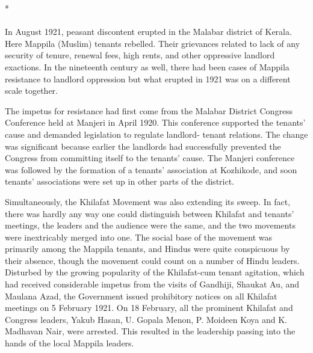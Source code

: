 \begin{center}*\end{center}

\paragraph*{}


In August 1921, peasant discontent erupted in the Malabar district of Kerala. Here Mappila (Muslim) tenants rebelled. Their grievances related to lack of any security of tenure, renewal fees, high rents, and other oppressive landlord exactions. In the nineteenth century as well, there had been cases of Mappila resistance to landlord oppression but what erupted in 1921 was on a different scale together.

The impetus for resistance had first come from the Malabar District Congress Conference held at Manjeri in April 1920. This conference supported the tenants' cause and demanded legislation to regulate landlord- tenant relations. The change was significant because earlier the landlords had successfully prevented the Congress from committing itself to the tenants' cause. The Manjeri conference was followed by the formation of a tenants' association at Kozhikode, and soon tenants' associations were set up in other parts of the district.

Simultaneously, the Khilafat Movement was also extending its sweep. In fact, there was hardly any way one could distinguish between Khilafat and tenants' meetings, the leaders and the audience were the same, and the two movements were inextricably merged into one. The social base of the movement was primarily among the Mappila tenants, and Hindus were quite conspicuous by their absence, though the movement could count on a number of Hindu leaders. Disturbed by the growing popularity of the Khilafat-cum­ tenant agitation, which had received considerable impetus from the visits of Gandhiji, Shaukat Au, and Maulana Azad, the Government issued prohibitory notices on all Khilafat meetings on 5 February 1921. On 18 February, all the prominent Khilafat and Congress leaders, Yakub Hasan, U. Gopala Menon, P. Moideen Koya and K. Madhavan Nair, were arrested. This resulted in the leadership passing into the hands of the local Mappila leaders.

